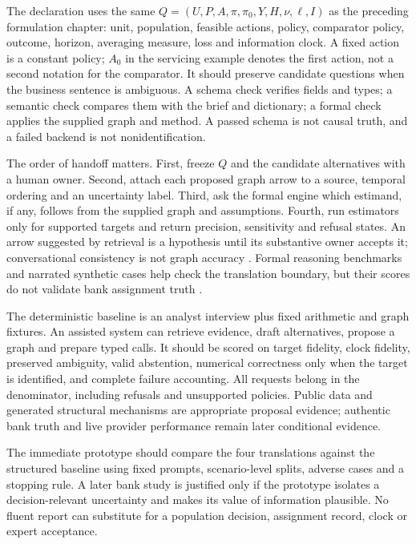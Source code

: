 The declaration uses the same $Q=(U,P,A,\pi,\pi_0,Y,H,\nu,\ell,I)$ as the preceding formulation chapter: unit, population, feasible actions, policy, comparator policy, outcome, horizon, averaging measure, loss and information clock. A fixed action is a constant policy; $A_0$ in the servicing example denotes the first action, not a second notation for the comparator. It should preserve candidate questions when the business sentence is ambiguous. A schema check verifies fields and types; a semantic check compares them with the brief and dictionary; a formal check applies the supplied graph and method. A passed schema is not causal truth, and a failed backend is not nonidentification.

The order of handoff matters. First, freeze $Q$ and the candidate alternatives with a human owner. Second, attach each proposed graph arrow to a source, temporal ordering and an uncertainty label. Third, ask the formal engine which estimand, if any, follows from the supplied graph and assumptions. Fourth, run estimators only for supported targets and return precision, sensitivity and refusal states. An arrow suggested by retrieval is a hypothesis until its substantive owner accepts it; conversational consistency is not graph accuracy \citep{v12_la_2305_00050,exec13_hallucination}. Formal reasoning benchmarks and narrated synthetic cases help check the translation boundary, but their scores do not validate bank assignment truth \citep{v12_la_2312_04350,v12_la_2607_08093}.

The deterministic baseline is an analyst interview plus fixed arithmetic and graph fixtures. An assisted system can retrieve evidence, draft alternatives, propose a graph and prepare typed calls. It should be scored on target fidelity, clock fidelity, preserved ambiguity, valid abstention, numerical correctness only when the target is identified, and complete failure accounting. All requests belong in the denominator, including refusals and unsupported policies. Public data and generated structural mechanisms are appropriate proposal evidence; authentic bank truth and live provider performance remain later conditional evidence.

The immediate prototype should compare the four translations against the structured baseline using fixed prompts, scenario-level splits, adverse cases and a stopping rule. A later bank study is justified only if the prototype isolates a decision-relevant uncertainty and makes its value of information plausible. No fluent report can substitute for a population decision, assignment record, clock or expert acceptance.
